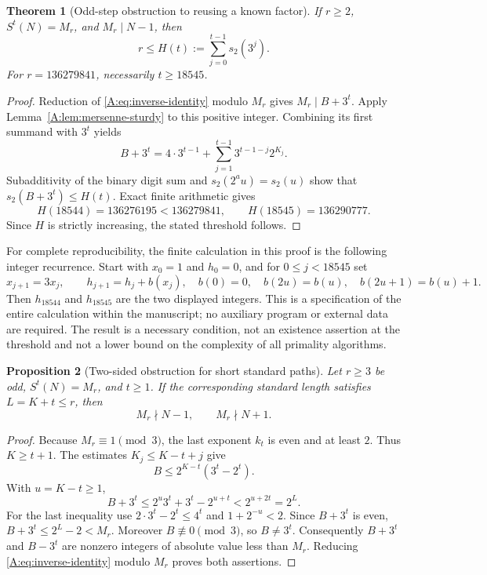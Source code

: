 \documentclass[11pt,a4paper]{article}
\newtheorem{theorem}{Theorem}[section]
\newtheorem{proposition}[theorem]{Proposition}
\theoremstyle{definition}
\theoremstyle{remark}
\numberwithin{equation}{section}
\begin{document}
\begin{theorem}[Odd-step obstruction to reusing a known factor]
\label{A:thm:popcount-barrier}
If $r\ge2$, $S^t(N)=M_r$, and $M_r\mid N-1$, then
\begin{equation}
 r\le H(t):=\sum_{j=0}^{t-1}s_2(3^j).
 \label{A:eq:popcount-barrier}
\end{equation}
For $r=136279841$, necessarily $t\ge18545$.
\end{theorem}
\begin{proof}
Reduction of \eqref{A:eq:inverse-identity} modulo $M_r$ gives
$M_r\mid B+3^t$. Apply Lemma~\ref{A:lem:mersenne-sturdy} to this positive
integer. Combining its first summand with $3^t$ yields
\[
 B+3^t=4\cdot3^{t-1}
 +\sum_{j=1}^{t-1}3^{t-1-j}2^{K_j}.
\]
Subadditivity of the binary digit sum and
$s_2(2^au)=s_2(u)$ show that $s_2(B+3^t)\le H(t)$.
Exact finite arithmetic gives
\[
 H(18544)=136276195<136279841,
 \qquad H(18545)=136290777.
\]
Since $H$ is strictly increasing, the stated threshold follows.
\end{proof}
For complete reproducibility, the finite calculation in this proof is the
following integer recurrence. Start with $x_0=1$ and $h_0=0$, and for
$0\le j<18545$ set
\[
 x_{j+1}=3x_j,\qquad h_{j+1}=h_j+b(x_j),
 \quad
 b(0)=0,\quad b(2u)=b(u),\quad b(2u+1)=b(u)+1.
\]
Then $h_{18544}$ and $h_{18545}$ are the two displayed integers.
This is a specification of the entire calculation within the manuscript;
no auxiliary program or external data are required. The result is a
necessary condition, not an existence assertion at the threshold and
not a lower bound on the complexity of all primality algorithms.

\begin{proposition}[Two-sided obstruction for short standard paths]
Let $r\ge3$ be odd, $S^t(N)=M_r$, and $t\ge1$.
If the corresponding standard length satisfies $L=K+t\le r$, then
\[
 M_r\nmid N-1,\qquad M_r\nmid N+1.
\]
\end{proposition}
\begin{proof}
Because $M_r\equiv1\pmod3$, the last exponent $k_t$ is even and at
least $2$. Thus $K\ge t+1$. The estimates $K_j\le K-t+j$ give
\[
 B\le 2^{K-t}(3^t-2^t).
\]
With $u=K-t\ge1$,
\[
 B+3^t\le 2^u3^t+3^t-2^{u+t}<2^{u+2t}=2^L.
\]
For the last inequality use $2\cdot3^t-2^t\le4^t$ and
$1+2^{-u}<2$. Since $B+3^t$ is even,
$B+3^t\le2^L-2<M_r$. Moreover $B\not\equiv0\pmod3$, so $B\ne3^t$.
Consequently $B+3^t$ and $B-3^t$ are nonzero integers of absolute value
less than $M_r$. Reducing \eqref{A:eq:inverse-identity} modulo $M_r$
proves both assertions.
\end{proof}
\end{document}

